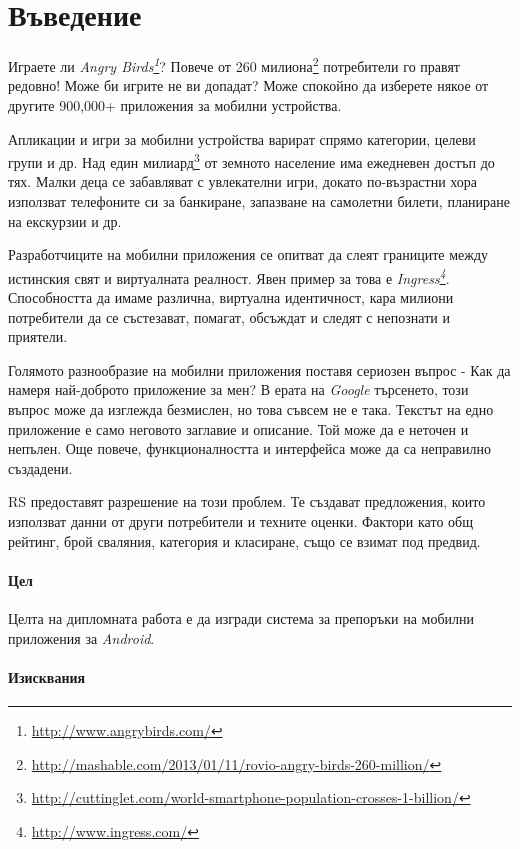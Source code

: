 \chapter*{Въведение}

	Играете ли \emph{Angry Birds\footnote{\url{http://www.angrybirds.com/}}}? Повече от 260 милиона\footnote{\url{http://mashable.com/2013/01/11/rovio-angry-birds-260-million/}} потребители го правят редовно! Може би игрите не ви допадат? Може спокойно да изберете някое от другите 900,000+ приложения за мобилни устройства.
	
	Апликации и игри за мобилни устройства варират спрямо категории, целеви групи и др. Над един милиард\footnote{\url{http://cuttinglet.com/world-smartphone-population-crosses-1-billion/}} от земното население има ежедневен достъп до тях. Малки деца се забавляват с увлекателни игри, докато по-възрастни хора използват телефоните си за банкиране, запазване на самолетни билети, планиране на екскурзии и др.
	
	Разработчиците на мобилни приложения се опитват да слеят границите между истинския свят и виртуалната реалност. Явен пример за това е \emph{Ingress\footnote{\url{http://www.ingress.com/}}}. Способността да имаме различна, виртуална идентичност, кара милиони потребители да се състезават, помагат, обсъждат и следят с непознати и приятели.
	
	Голямото разнообразие на мобилни приложения поставя сериозен въпрос - Как да намеря най-доброто приложение за мен? В ерата на \emph{Google} търсенето, този въпрос може да изглежда безмислен, но това съвсем не е така. Текстът на едно приложение е само неговото заглавие и описание. Той може да е неточен и непълен. Още повече, функционалността и интерфейса може да са неправилно създадени.
	
	\ac{RS} предоставят разрешение на този проблем. Те създават предложения, които използват данни от други потребители и техните оценки. Фактори като общ рейтинг, брой сваляния, категория и класиране, също се взимат под предвид.

	\subsubsection{Цел}
	
		Целта на дипломната работа е да изгради система за препоръки на мобилни приложения за \emph{Android}.

	\subsubsection{Изисквания}


